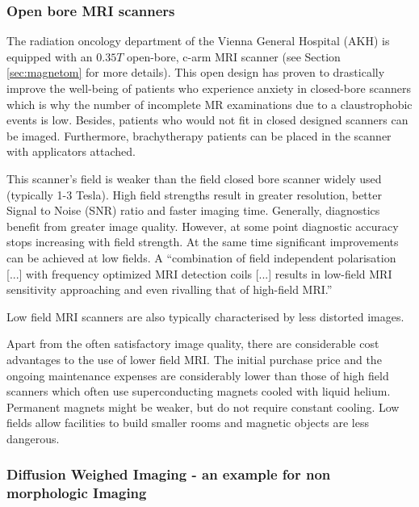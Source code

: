 \subsubsection{Open bore MRI scanners}

The radiation oncology department of the Vienna General Hospital (AKH) is equipped with an $0.35  T$ open-bore, c-arm MRI scanner (see Section \ref{sec:magnetom} for more details).
This open design has proven to drastically improve the well-being of patients who experience anxiety in closed-bore scanners which is why the number of incomplete MR examinations due to a claustrophobic events is low. \cite{Enders2011a, Bangard2007}
Besides, patients who would not fit in closed designed scanners can be imaged.
Furthermore, brachytherapy patients can be placed in the scanner with applicators attached.

This scanner's field is weaker than the field closed bore scanner widely used (typically 1-3 Tesla).
High field strengths result in greater resolution, better Signal to Noise (SNR) ratio and faster imaging time.
Generally, diagnostics benefit from greater image quality.
However, at some point diagnostic accuracy stops increasing with field strength.
At the same time significant improvements can be achieved at low fields.
A ``combination of field independent polarisation [...] with frequency optimized MRI detection coils [...] results in low-field MRI sensitivity approaching and even rivalling that of high-field MRI.'' \cite{Coffey2013}

Low field MRI scanners are also typically characterised by less distorted images. \cite{https://link.springer.com/article/10.1007/PL00002385}

Apart from the often satisfactory image quality, there are considerable cost advantages to the use of lower field MRI.
The initial purchase price and the ongoing maintenance expenses are considerably lower than those of high field scanners which often use superconducting magnets cooled with liquid helium. \cite{Rutt1996}
Permanent magnets might be weaker, but do not require constant cooling.
Low fields allow facilities to build smaller rooms and magnetic objects are less dangerous.


\subsubsection{Diffusion Weighed Imaging - an example for non morphologic Imaging}


